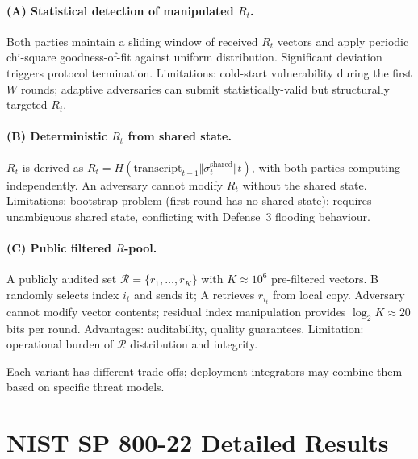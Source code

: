 \documentclass[11pt,a4paper]{article}
\begin{document}
\paragraph{(A) Statistical detection of manipulated $R_t$.} Both parties maintain a sliding window of received $R_t$ vectors and apply periodic chi-square goodness-of-fit against uniform distribution. Significant deviation triggers protocol termination. Limitations: cold-start vulnerability during the first $W$ rounds; adaptive adversaries can submit statistically-valid but structurally targeted $R_t$.

\paragraph{(B) Deterministic $R_t$ from shared state.} $R_t$ is derived as $R_t = H(\text{transcript}_{t-1} \Vert \sigma_t^{\text{shared}} \Vert t)$, with both parties computing independently. An adversary cannot modify $R_t$ without the shared state. Limitations: bootstrap problem (first round has no shared state); requires unambiguous shared state, conflicting with Defense~3 flooding behaviour.

\paragraph{(C) Public filtered $R$-pool.} A publicly audited set $\mathcal{R} = \{r_1, \ldots, r_K\}$ with $K \approx 10^6$ pre-filtered vectors. B randomly selects index $i_t$ and sends it; A retrieves $r_{i_t}$ from local copy. Adversary cannot modify vector contents; residual index manipulation provides $\log_2 K \approx 20$ bits per round. Advantages: auditability, quality guarantees. Limitation: operational burden of $\mathcal{R}$ distribution and integrity.

Each variant has different trade-offs; deployment integrators may combine them based on specific threat models.

\section{NIST SP 800-22 Detailed Results}\label{app:nist}
\end{document}
